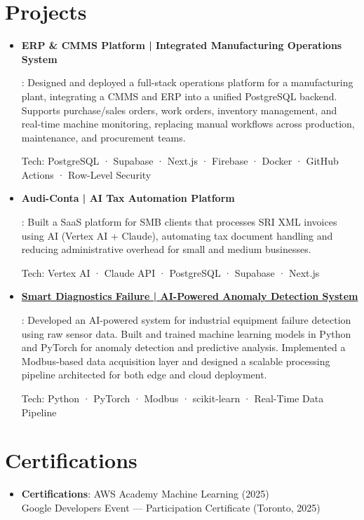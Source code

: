 \documentclass[letterpaper,11pt]{article}
\newcommand{\resumeItem}[2]{
  \item\small{
    \textbf{#1}{: #2 \vspace{-2pt}}
  }
}
\newcommand{\resumeSubItem}[2]{\resumeItem{#1}{#2}\vspace{-4pt}}
\newcommand{\resumeSubHeadingListStart}{\begin{itemize}[leftmargin=*]}
\newcommand{\resumeSubHeadingListEnd}{\end{itemize}}
\begin{document}
\section{Projects}
\resumeSubHeadingListStart

  \resumeSubItem{ERP \& CMMS Platform | Integrated Manufacturing Operations System}
    {Designed and deployed a full-stack operations platform for a manufacturing plant, integrating a CMMS and ERP into a unified PostgreSQL backend. Supports purchase/sales orders, work orders, inventory management, and real-time machine monitoring, replacing manual workflows across production, maintenance, and procurement teams.

    Tech: PostgreSQL · Supabase · Next.js · Firebase · Docker · GitHub Actions · Row-Level Security}

  \resumeSubItem{Audi-Conta | AI Tax Automation Platform}
    {Built a SaaS platform for SMB clients that processes SRI XML invoices using AI (Vertex AI + Claude), automating tax document handling and reducing administrative overhead for small and medium businesses.

    Tech: Vertex AI · Claude API · PostgreSQL · Supabase · Next.js}

  \resumeSubItem{\href{https://github.com/DylanN25/SmartDiagnosticsFailure}{Smart Diagnostics Failure | AI-Powered Anomaly Detection System}}
    {Developed an AI-powered system for industrial equipment failure detection using raw sensor data. Built and trained machine learning models in Python and PyTorch for anomaly detection and predictive analysis. Implemented a Modbus-based data acquisition layer and designed a scalable processing pipeline architected for both edge and cloud deployment.

    Tech: Python · PyTorch · Modbus · scikit-learn · Real-Time Data Pipeline}

\resumeSubHeadingListEnd

\section{Certifications}
\resumeSubHeadingListStart
  \resumeSubItem{Certifications}
    {AWS Academy Machine Learning (2025) \\ Google Developers Event --- Participation Certificate (Toronto, 2025)}
\resumeSubHeadingListEnd
\end{document}
